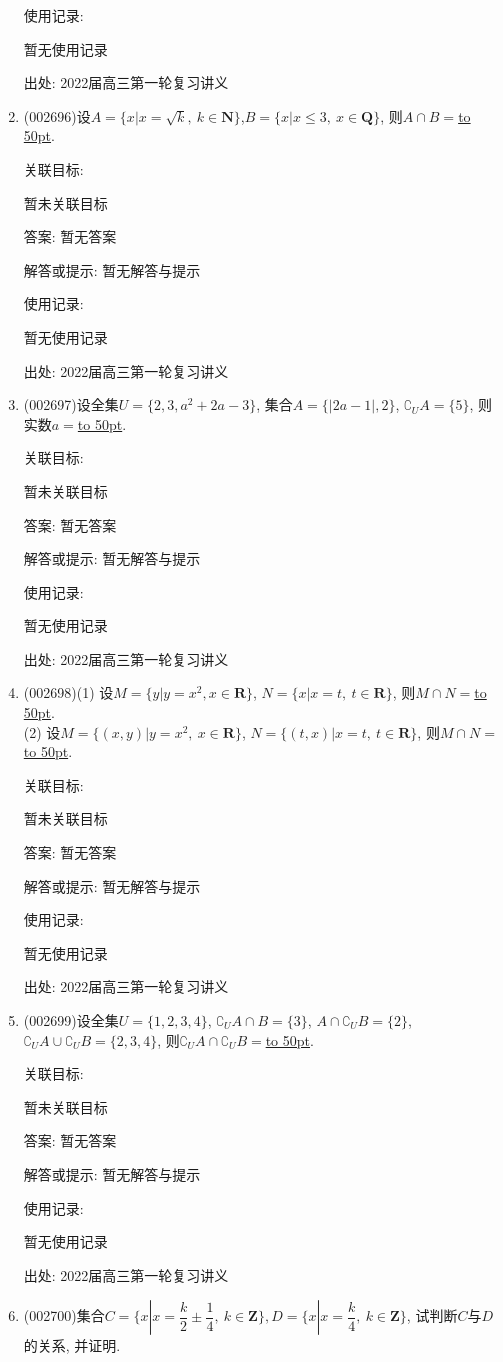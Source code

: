 \documentclass[10pt,a4paper]{article}
\newcommand{\blank}[1]{\underline{\hbox to #1pt{}}}
\begin{document}
\begin{enumerate}[1.]
使用记录:

暂无使用记录


出处: 2022届高三第一轮复习讲义
\item { (002696)}设$A=\{x|x=\sqrt k, \ k\in \mathbf{N}\}$,$B=\{x|x\le 3,\ x\in \mathbf{Q}\}$, 则$A\cap B=$\blank{50}.


关联目标:

暂未关联目标

答案: 暂无答案

解答或提示: 暂无解答与提示

使用记录:

暂无使用记录


出处: 2022届高三第一轮复习讲义
\item { (002697)}设全集$U=\{2,3,a^2+2a-3\}$, 集合$A=\{|2a-1|,2\}$, $\complement_U A=\{5\}$, 则实数$a=$\blank{50}.


关联目标:

暂未关联目标

答案: 暂无答案

解答或提示: 暂无解答与提示

使用记录:

暂无使用记录


出处: 2022届高三第一轮复习讲义
\item { (002698)}(1) 设$M=\{y|y=x^2, x\in \mathbf{R}\}$, $N=\{x|x=t,\ t\in \mathbf{R}\}$, 则$M\cap N=$\blank{50}.\\
(2) 设$M=\{(x,y)|y=x^2,\ x\in \mathbf{R}\}$, $N=\{(t,x)|x=t,\ t\in \mathbf{R}\}$, 则$M\cap N=$\blank{50}.


关联目标:

暂未关联目标

答案: 暂无答案

解答或提示: 暂无解答与提示

使用记录:

暂无使用记录


出处: 2022届高三第一轮复习讲义
\item { (002699)}设全集$U=\{1,2,3,4\}$, $\complement_U A\cap B=\{3\}$, $A\cap \complement_U B=\{2\}$, $\complement_U A\cup \complement_U B=\{2,3,4\}$, 则$\complement_U A\cap \complement_U B=$\blank{50}.


关联目标:

暂未关联目标

答案: 暂无答案

解答或提示: 暂无解答与提示

使用记录:

暂无使用记录


出处: 2022届高三第一轮复习讲义
\item { (002700)}集合$C=\{x|x=\dfrac k2\pm \dfrac14, \ k\in \mathbf{Z}\},D=\{x|x=\dfrac k4,\ k\in \mathbf{Z}\}$, 试判断$C$与$D$的关系, 并证明.



\end{enumerate}
\end{document}
